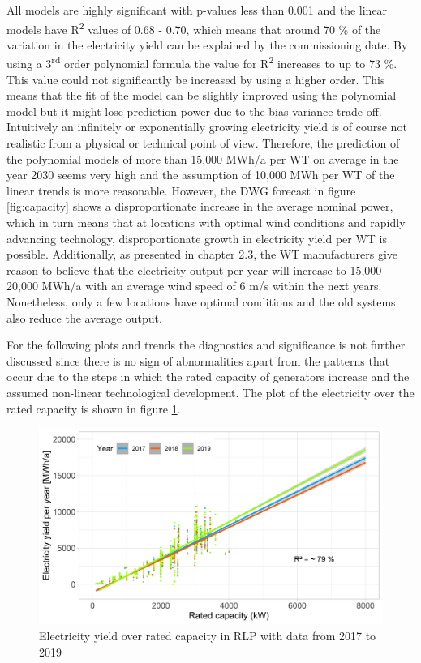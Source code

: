 \documentclass[a4paper,11pt]{article}
\begin{document}
All models are highly significant with p-values less than 0.001 and the linear models have R\textsuperscript{2} values of 0.68 - 0.70, which means that around 70 \% of the variation in the electricity yield can be explained by the commissioning date. By using a 3\textsuperscript{rd} order polynomial formula the value for R\textsuperscript{2} increases to up to 73 \%. This value could not significantly be increased by using a higher order. This means that the fit of the model can be slightly improved using the polynomial model but it might lose prediction power due to the bias variance trade-off. Intuitively an infinitely or exponentially growing electricity yield is of course not realistic from a physical or technical point of view. Therefore, the prediction of the polynomial models of more than 15,000 MWh/a per WT on average in the year 2030 seems very high and the assumption of 10,000 MWh per WT of the linear trends is more reasonable. However, the DWG forecast in figure \ref{fig:capacity} shows a disproportionate increase in the average nominal power, which in turn means that at locations with optimal wind conditions and rapidly advancing technology, disproportionate growth in electricity yield per WT is possible. Additionally, as presented in chapter 2.3, the WT manufacturers give reason to believe that the electricity output per year will increase to 15,000 - 20,000 MWh/a with an average wind speed of 6 m/s within the next years. Nonetheless, only a few locations have optimal conditions and the old systems also reduce the average output.

For the following plots and trends the diagnostics and significance is not further discussed since there is no sign of abnormalities apart from the patterns that occur due to the steps in which the rated capacity of generators increase and the assumed non-linear technological development. The plot of the electricity over the rated capacity is shown in figure \ref{fig:eratedcapacity}.
\begin{figure}[H]

{\centering \includegraphics[width=1\linewidth]{data/Amprion/results_of_analysis/electricity_rated_capacity} 

}

\caption{Electricity yield over rated capacity in RLP with data from 2017 to 2019}\label{fig:eratedcapacity}
\end{figure}
\newpage
\end{document}

